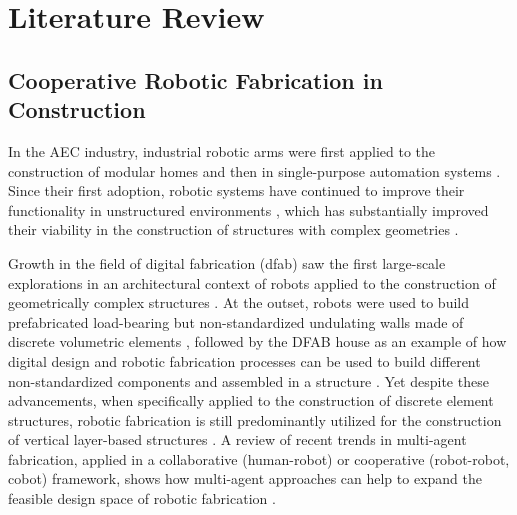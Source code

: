 \section{Literature Review} \label{sec:2_litreview}

\subsection{Cooperative Robotic Fabrication in Construction} \label{sec:2__robotfab}
    In the AEC industry, industrial robotic arms were first applied to the construction of modular homes  \citep{bock_construction_2007, bock_future_2015} and then in single-purpose automation systems \citep{albus_trip_1986, cousineau_construction_1998, huang_factor_1990, ueno_construction_1986}. Since their first adoption, robotic systems have continued to improve their functionality in unstructured environments \citep{bock_site_2016, skibniewski_robotics_1989}, which has substantially improved their viability in the construction of structures with complex geometries \citep{davila_delgado_robotics_2019}.
    
    Growth in the field of digital fabrication (dfab) saw the first large-scale explorations in an architectural context of robots applied to the construction of geometrically complex structures \citep{gramazio_digital_2008, gramazio_made_2014, kohler_programmed_2014}. At the outset, robots were used to build prefabricated load-bearing but non-standardized undulating walls made of discrete volumetric elements \citep{bonwetsch_informed_2006, bonwetsch_digitally_2007, kohler_gantenbein_2014}, followed by the DFAB house \citep{empa_dfab_2021} as an example of how digital design and robotic fabrication processes can be used to build different non-standardized components and assembled in a structure \citep{willmann_robotic_2016, hack_mesh_2017, hack_structural_2020}. Yet despite these advancements, when specifically applied to the construction of discrete element structures, robotic fabrication is still predominantly utilized for the construction of vertical layer-based structures \citep{bartschi_wiggled_2010,kohler_gantenbein_2014, bonwetsch_informed_2006, bonwetsch_digitally_2007, piskorec_brick_2018, dorfler_mobile_2016, giftthaler_mobile_2017}. A review of recent trends in multi-agent fabrication, applied in a collaborative (human-robot) or cooperative (robot-robot, cobot) framework, shows how multi-agent approaches can help to expand the feasible design space of robotic fabrication \citep{han_bridging_2021, petersen_review_2019, braganca_brief_2019}.
    
